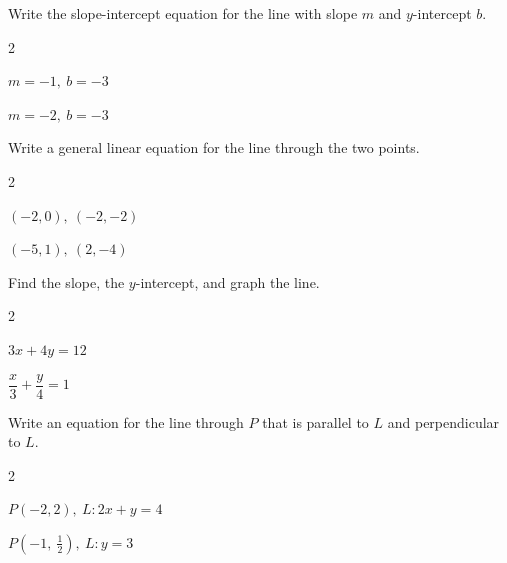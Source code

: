 \documentclass[11pt]{article}
\begin{document}
\begin{enumerate}
        \noindent Write the slope-intercept equation for the line with slope $m$ and $y$-intercept $b$.

        \begin{multicols}{2}
            \item $\displaystyle m = -1,\ b = -3$\\[4ex]
            \item $\displaystyle m = -2,\ b = -3$\\[4ex]
        \end{multicols}

        \noindent Write a general linear equation for the line through the two points.

        \begin{multicols}{2}
            \item $\displaystyle (-2, 0),\ (-2, -2)$\\[4ex]
            \item $\displaystyle (-5, 1),\ (2, -4)$\\[4ex]
        \end{multicols}

        \noindent Find the slope, the $y$-intercept, and graph the line.

        \begin{multicols}{2}
            \item $\displaystyle 3x + 4y = 12$\\[1ex]\smallgraph
            \item $\displaystyle \dfrac{x}{3} + \dfrac{y}{4} = 1$\\[1ex]\smallgraph
        \end{multicols}

        \vspace{1ex}

        \noindent Write an equation for the line through $P$ that is parallel to $L$ and perpendicular to $L$.

        \begin{multicols}{2}
            \item $\displaystyle P(-2, 2),\ L\colon 2x + y = 4$\\[6ex]
            \item $\displaystyle P\!\left(-1,\ \tfrac{1}{2}\right),\ L\colon y = 3$\\[6ex]
        \end{multicols}

        \vspace{1ex}


\end{enumerate}
\end{document}
